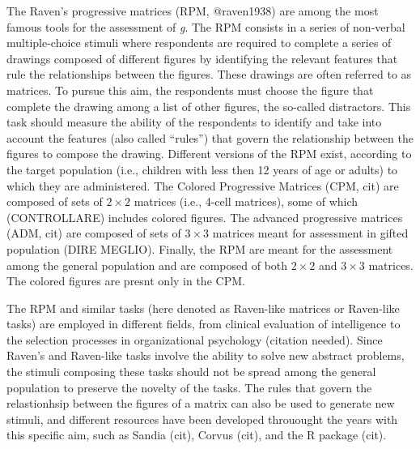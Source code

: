 The Raven's progressive matrices (RPM, @raven1938) are among the most famous tools for the assessment of \emph{g}.
The RPM consists in a series of non-verbal multiple-choice stimuli where respondents are required to complete a series of drawings composed of different figures by identifying the relevant features that rule the relationships between the figures.
These drawings are often referred to as matrices.
To pursue this aim, the respondents must choose the figure that complete the drawing among a list of other figures, the so-called distractors.
This task should measure the ability of the respondents to identify and take into account the features (also called ``rules'') that govern the relationship between the figures to compose the drawing.
Different versions of the RPM exist, according to the target population (i.e., children with less then 12 years of age or adults) to which they are administered.
The Colored Progressive Matrices (CPM, cit) are composed of sets of \(2\times2\) matrices (i.e., 4-cell matrices), some of which (CONTROLLARE) includes colored figures.
The advanced progressive matrices (ADM, cit) are composed of sets of \(3\times3\) matrices meant for assessment in gifted population (DIRE MEGLIO).
Finally, the RPM are meant for the assessment among the general population and are composed of both \(2\times2\) and \(3\times3\) matrices.
The colored figures are presnt only in the CPM.

The RPM and similar tasks (here denoted as Raven-like matrices or Raven-like tasks) are employed in different fields, from clinical evaluation of intelligence to the selection processes in organizational psychology (citation needed).
Since Raven's and Raven-like tasks involve the ability to solve new abstract problems, the stimuli composing these tasks should not be spread among the general population to preserve the novelty of the tasks.
The rules that govern the relastionhsip between the figures of a matrix can also be used to generate new stimuli, and different resources have been developed throuought the years with this specific aim, such as Sandia (cit), Corvus (cit), and the R package  (cit).

